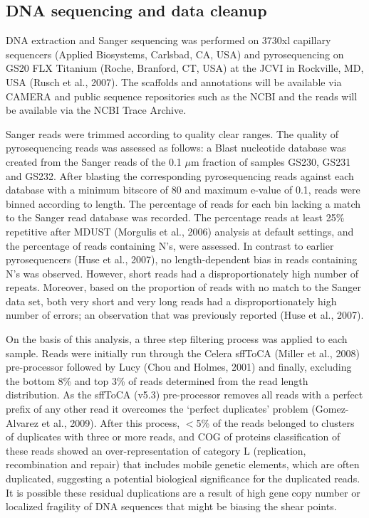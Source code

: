 \subsection{DNA sequencing and data cleanup}
DNA extraction and Sanger sequencing was performed on 3730xl capillary sequencers (Applied Biosystems, Carlsbad, CA, USA) and pyrosequencing on GS20 FLX Titanium (Roche, Branford, CT, USA) at the \acl{JCVI} in Rockville, MD, USA (Rusch et al., 2007). 
The scaffolds and annotations will be available via \ac{CAMERA} and public sequence repositories such as the \ac{NCBI} and the reads will be available via the \ac{NCBI} Trace Archive. 

Sanger reads were trimmed according to quality clear ranges.
The quality of pyrosequencing reads was assessed as follows: 
a Blast nucleotide database was created from the Sanger reads of the 0.1 $\mu$m fraction of samples GS230, GS231 and GS232. 
After blasting the corresponding pyrosequencing reads against each database with a minimum bitscore of 80 and maximum e-value of 0.1, reads were binned according to length.
The percentage of reads for each bin lacking a match to the Sanger read database was recorded. 
The percentage reads at least 25\% repetitive after MDUST (Morgulis et al., 2006) analysis at default settings, and the percentage of reads containing N’s, were assessed. 
In contrast to earlier pyrosequencers (Huse et al., 2007), no length-dependent bias in reads containing N’s was observed. 
However, short reads had a disproportionately high number of repeats. 
Moreover, based on the proportion of reads with no match to the Sanger data set, both very short and very long reads had a disproportionately high number of errors; an observation that was previously reported (Huse et al., 2007).

On the basis of this analysis, a three step filtering process was applied to each sample. 
Reads were initially run through the Celera sffToCA (Miller et al., 2008) pre-processor followed by Lucy (Chou and Holmes, 2001) and finally, excluding the bottom 8\% and top 3\% of reads determined from the read length distribution. 
As the sffToCA (v5.3) pre-processor removes all reads with a perfect prefix of any other read it overcomes the `perfect duplicates’ problem (Gomez-Alvarez et al., 2009). 
After this process, $<$5\% of the reads belonged to clusters of duplicates with three or more reads, and \ac{COG} of proteins classification of these reads showed an over-representation of category L (replication, recombination and repair) that includes mobile genetic elements, which are often duplicated, suggesting a potential biological significance for the duplicated reads. 
It is possible these residual duplications are a result of high gene copy number or localized fragility of DNA sequences that might be biasing the shear points.

